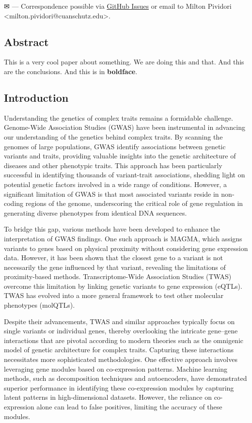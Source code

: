 \leavevmode{}%
✉ --- Correspondence possible via \href{https://github.com/pivlab/annual_review_of_biomedical_data_science/issues}{GitHub Issues}
or email to
Milton Pividori \textless milton.pividori@cuanschutz.edu\textgreater.

\hypertarget{abstract}{%
\subsection{Abstract}\label{abstract}}

This is a very cool paper about something.
We are doing this and that.
And this are the conclusions.
And this is in \textbf{boldface}.

\hypertarget{introduction}{%
\subsection{Introduction}\label{introduction}}

Understanding the genetics of complex traits remains a formidable challenge.
Genome-Wide Association Studies (GWAS) have been instrumental in advancing our understanding of the genetics behind complex traits.
By scanning the genomes of large populations, GWAS identify associations between genetic variants and traits, providing valuable insights into the genetic architecture of diseases and other phenotypic traits.
This approach has been particularly successful in identifying thousands of variant-trait associations, shedding light on potential genetic factors involved in a wide range of conditions.
However, a significant limitation of GWAS is that most associated variants reside in non-coding regions of the genome, underscoring the critical role of gene regulation in generating diverse phenotypes from identical DNA sequences.

To bridge this gap, various methods have been developed to enhance the interpretation of GWAS findings.
One such approach is MAGMA, which assigns variants to genes based on physical proximity without considering gene expression data.
However, it has been shown that the closest gene to a variant is not necessarily the gene influenced by that variant, revealing the limitations of proximity-based methods.
Transcriptome-Wide Association Studies (TWAS) overcome this limitation by linking genetic variants to gene expression (eQTLs).
TWAS has evolved into a more general framework to test other molecular phenotypes (molQTLs).

Despite their advancements, TWAS and similar approaches typically focus on single variants or individual genes, thereby overlooking the intricate gene--gene interactions that are pivotal according to modern theories such as the omnigenic model of genetic architecture for complex traits.
Capturing these interactions necessitates more sophisticated methodologies.
One effective approach involves leveraging gene modules based on co-expression patterns.
Machine learning methods, such as decomposition techniques and autoencoders, have demonstrated superior performance in identifying these co-expression modules by capturing latent patterns in high-dimensional datasets.
However, the reliance on co-expression alone can lead to false positives, limiting the accuracy of these modules.


